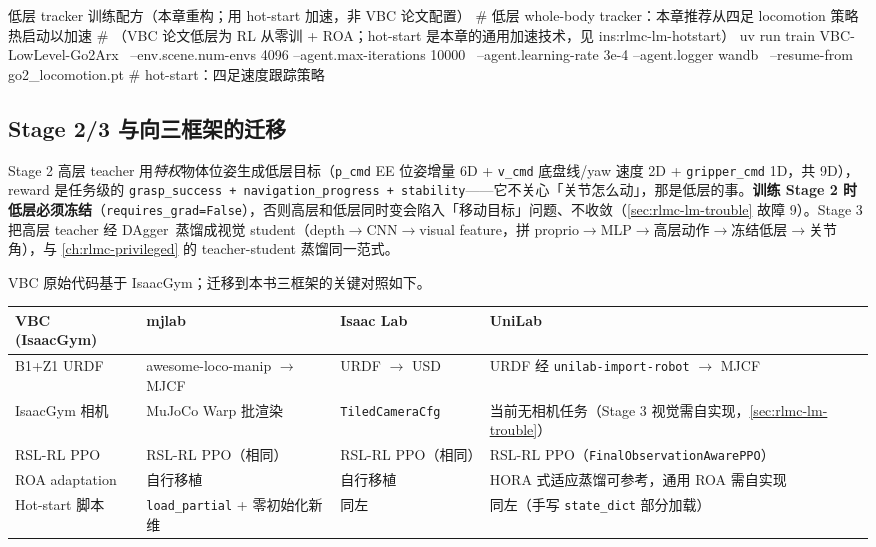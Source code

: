 \begin{codebox}[bash]{低层 tracker 训练配方（本章重构；用 hot-start 加速，非 VBC 论文配置）}
# 低层 whole-body tracker：本章推荐从四足 locomotion 策略热启动以加速
#   （VBC 论文低层为 RL 从零训 + ROA；hot-start 是本章的通用加速技术，见 ins:rlmc-lm-hotstart）
uv run train VBC-LowLevel-Go2Arx \
  --env.scene.num-envs 4096 --agent.max-iterations 10000 \
  --agent.learning-rate 3e-4 --agent.logger wandb \
  --resume-from go2_locomotion.pt          # hot-start：四足速度跟踪策略
\end{codebox}

\subsection{Stage 2/3 与向三框架的迁移}
\label{sec:rlmc-lm-vbc-migrate}

Stage 2 高层 teacher 用\emph{特权}物体位姿生成低层目标（\verb|p_cmd| EE 位姿增量 6D + \verb|v_cmd| 底盘线/yaw 速度 2D + \verb|gripper_cmd| 1D，共 9D），reward 是任务级的 \verb|grasp_success + navigation_progress + stability|——它不关心「关节怎么动」，那是低层的事。\textbf{训练 Stage 2 时低层必须冻结}（\verb|requires_grad=False|），否则高层和低层同时变会陷入「移动目标」问题、不收敛（\cref{sec:rlmc-lm-trouble} 故障 9）。Stage 3 把高层 teacher 经 DAgger\,\cite{ross2011dagger} 蒸馏成视觉 student（depth$\to$CNN$\to$visual feature，拼 proprio$\to$MLP$\to$高层动作$\to$冻结低层$\to$关节角），与 \cref{ch:rlmc-privileged} 的 teacher-student 蒸馏同一范式。

VBC 原始代码基于 IsaacGym；迁移到本书三框架的关键对照如下。

\begin{center}
\small
\begin{tabular}{@{}p{3.0cm}p{3.4cm}p{3.4cm}p{3.6cm}@{}}
\toprule
VBC (IsaacGym) & mjlab & Isaac Lab & UniLab \\
\midrule
B1+Z1 URDF & awesome-loco-manip $\to$ MJCF & URDF $\to$ USD & URDF 经 \verb|unilab-import-robot| $\to$ MJCF \\
IsaacGym 相机 & MuJoCo Warp 批渲染 & \verb|TiledCameraCfg| & 当前无相机任务（Stage 3 视觉需自实现，\cref{sec:rlmc-lm-trouble}） \\
RSL-RL PPO & RSL-RL PPO（相同） & RSL-RL PPO（相同） & RSL-RL PPO（\verb|FinalObservationAwarePPO|）\\
ROA adaptation & 自行移植 & 自行移植 & HORA 式适应蒸馏可参考，通用 ROA 需自实现 \\
Hot-start 脚本 & \verb|load_partial| + 零初始化新维 & 同左 & 同左（手写 \verb|state_dict| 部分加载）\\
\bottomrule
\end{tabular}
\end{center}

